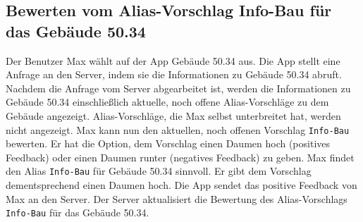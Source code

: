 \subsection{Bewerten vom Alias-Vorschlag Info-Bau für das Gebäude 50.34}

Der Benutzer Max wählt auf der App Gebäude 50.34 aus.
Die App stellt eine Anfrage an den Server, indem sie die Informationen zu Gebäude 50.34 abruft. 
Nachdem die Anfrage vom Server abgearbeitet ist, werden die Informationen zu Gebäude 50.34 einschließlich aktuelle, noch offene Alias-Vorschläge zu dem Gebäude angezeigt.
Alias-Vorschläge, die Max selbst unterbreitet hat, werden nicht angezeigt.
Max kann nun den aktuellen, noch offenen Vorschlag \texttt{Info-Bau} bewerten.
Er hat die Option, dem Vorschlag einen Daumen hoch (positives Feedback) oder einen Daumen runter (negatives Feedback) zu geben.
Max findet den Alias \texttt{Info-Bau} für Gebäude 50.34 sinnvoll.
Er gibt dem Vorschlag dementsprechend einen Daumen hoch.
Die App sendet das positive Feedback von Max an den Server.
Der Server aktualisiert die Bewertung des Alias-Vorschlags \texttt{Info-Bau} für das Gebäude 50.34.